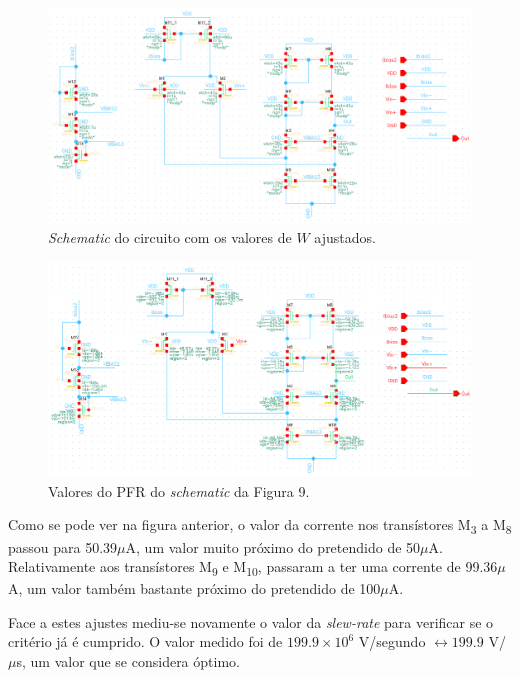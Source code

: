 \documentclass[11pt]{article}
\numberwithin{equation}{section}
\begin{document}
\begin{figure}[H]
	\centering
	\includegraphics[keepaspectratio=true, scale=0.70]{exps/Wajustados}
	\vspace{-0.5em}
	\caption{\textit{Schematic} do circuito com os valores de $W$ ajustados.}
	\label{fig:ajustefail}
	\vspace{-0.8em}
\end{figure}

\begin{figure}[H]
	\centering
	\includegraphics[keepaspectratio=true, scale=0.85]{exps/PFRajustados}
	\vspace{-0.5em}
	\caption{Valores do PFR do \textit{schematic} da Figura 9.}
	\vspace{-0.8em}
\end{figure}

Como se pode ver na figura anterior, o valor da corrente nos transístores M\textsubscript{3} a M\textsubscript{8} passou para 50.39$\mu$A, um valor muito próximo do pretendido de 50$\mu$A. Relativamente aos transístores M\textsubscript{9} e M\textsubscript{10}, passaram a ter uma corrente de 99.36$\mu$A, um valor também bastante próximo do pretendido de 100$\mu$A.

Face a estes ajustes mediu-se novamente o valor da \textit{slew-rate} para verificar se o critério já é cumprido. O valor medido foi de $199.9\times10^6$ V/segundo $\leftrightarrow 199.9$ V/$\mu$s, um valor que se considera óptimo.
\end{document}
